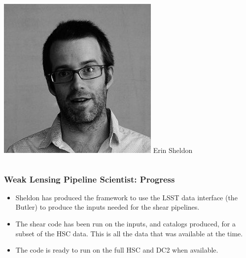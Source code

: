 \documentclass{beamer}
\begin{document}
{\begin{columns}
        \begin{column}{0.3\textwidth}
            \begin{center}
                \includegraphics[width=\textwidth]{sheldon.png}
                \newline
                {\tiny Erin Sheldon}
            \end{center}
        \end{column}

    \end{columns}

}

\frame
{

    \frametitle{Weak Lensing Pipeline Scientist: Progress}


    \begin{itemize}

        \item Sheldon has produced the framework to
            use the LSST data interface (the Butler) to
            produce the inputs needed for the shear
            pipelines.

        \item The shear code has been run on the inputs, 
            and catalogs produced, for a subset of the 
            HSC data.  This is all the data that
            was available at the time.

        \item The code is ready to run on the full HSC
            and DC2 when available.

    \end{itemize}
}
\end{document}
